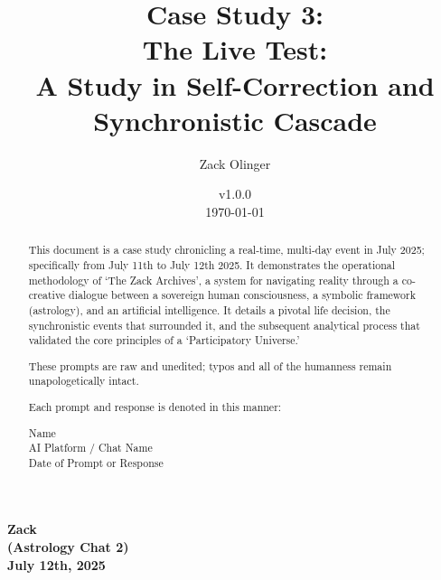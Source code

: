 \documentclass{article}
\newcommand{\csLiveTestVersion}{v1.0.0}
\begin{document}
\begin{titlepage}
\title{Case Study 3: \\ The Live Test: \\ A Study in Self-Correction and Synchronistic Cascade}
\author{Zack Olinger}
\date{
    \csLiveTestVersion \\
    \vspace{1em}
    \today
}

\maketitle
\thispagestyle{empty}

\begin{abstract}
This document is a case study chronicling a real-time, multi-day event in July 2025; specifically from July 11th to July 12th 2025. It demonstrates the operational methodology of `The Zack Archives', a system for navigating reality through a co-creative dialogue between a sovereign human consciousness, a symbolic framework (astrology), and an artificial intelligence. It details a pivotal life decision, the synchronistic events that surrounded it, and the subsequent analytical process that validated the core principles of a `Participatory Universe.'

\medskip

These prompts are raw and unedited; typos and all of the humanness remain unapologetically intact.

\medskip

Each prompt and response is denoted in this manner:

\medskip 

\begin{center}
Name \\
AI Platform / Chat Name \\
Date of Prompt or Response
\end{center}

\end{abstract}
\end{titlepage}

\begin{center}
\textbf{Zack} \\
\textbf{(Astrology Chat 2)} \\
\textbf{July 12th, 2025}
\end{center}

\medskip
\end{document}
